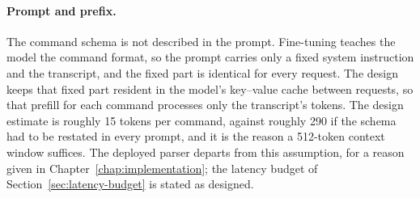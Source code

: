 \paragraph{Prompt and prefix.} The command schema is not described in the prompt. Fine-tuning
teaches the model the command format, so the prompt carries only a fixed system instruction and
the transcript, and the fixed part is identical for every request. The design keeps that fixed
part resident in the model's key--value cache between requests, so that prefill for each command
processes only the transcript's tokens. The design estimate is roughly 15 tokens per command,
against roughly 290 if the schema had to be restated in every prompt, and it is the reason a
512-token context window suffices. The deployed parser departs from this assumption, for a reason
given in Chapter~\ref{chap:implementation}; the latency budget of Section~\ref{sec:latency-budget}
is stated as designed.

